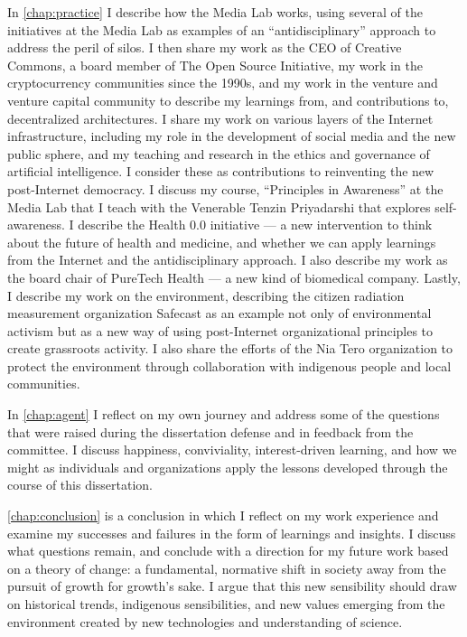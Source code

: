 In \autoref{chap:practice} I describe how the Media Lab works, using several of the initiatives at the Media Lab as examples of an ``antidisciplinary'' approach to address the peril of silos. I then share my work as the CEO of Creative Commons, a board member of The Open Source Initiative, my work in the cryptocurrency communities since the 1990s, and my work in the venture and venture capital community to describe my learnings from, and contributions to, decentralized architectures. I share my work on various layers of the Internet infrastructure, including my role in the development of social media and the new public sphere, and my teaching and research in the ethics and governance of artificial intelligence. I consider these as contributions to reinventing the new post-Internet democracy. I discuss my course, ``Principles in Awareness'' at the Media Lab that I teach with the Venerable Tenzin Priyadarshi that explores self-awareness. I describe the Health 0.0 initiative --- a new intervention to think about the future of health and medicine, and whether we can apply learnings from the Internet and the antidisciplinary approach. I also describe my work as the board chair of PureTech Health --- a new kind of biomedical company. Lastly, I describe my work on the environment, describing the citizen radiation measurement organization Safecast as an example not only of environmental activism but as a new way of using post-Internet organizational principles to create grassroots activity. I also share the efforts of the Nia Tero organization to protect the environment through collaboration with indigenous people and local communities.

In \autoref{chap:agent} I reflect on my own journey and address some of the questions that were raised during the dissertation defense and in feedback from the committee. I discuss happiness, conviviality, interest-driven learning, and how we might as individuals and organizations apply the lessons developed through the course of this dissertation.

\autoref{chap:conclusion} is a conclusion in which I reflect on my work experience and examine my successes and failures in the form of learnings and insights. I discuss what questions remain, and conclude with a direction for my future work based on a theory of change: a fundamental, normative shift in society away from the pursuit of growth for growth's sake. I argue that this new sensibility should draw on historical trends, indigenous sensibilities, and new values emerging from the environment created by new technologies and understanding of science.

